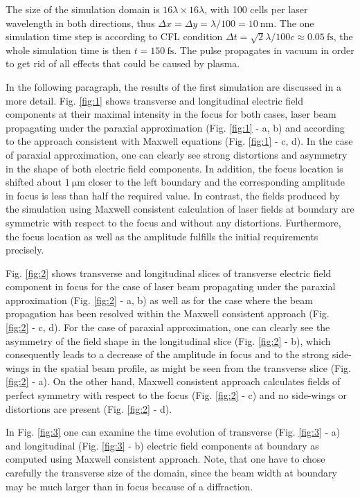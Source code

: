 The size of the simulation domain is $ 16 \lambda \times 16 \lambda $, with 100 cells per laser wavelength in both directions, thus $ \Delta x = \Delta y = \lambda/100 = 10 \: \mathrm{nm} $. The one simulation time step is according to CFL condition $ \Delta t = \sqrt{2} \lambda/ 100 c \approx 0.05 \: \mathrm{fs} $, the whole simulation time is then $ t = 150 \: \mathrm{fs} $. The pulse propagates in vacuum in order to get rid of all effects that could be caused by plasma.

In the following paragraph, the results of the first simulation are discussed in a more detail. Fig. \ref{fig:1} shows transverse and longitudinal electric field components at their maximal intensity in the focus for both cases, laser beam propagating under the paraxial approximation (Fig. \ref{fig:1} - a, b) and according to the approach consistent with Maxwell equations (Fig. \ref{fig:1} - c, d). In the case of paraxial approximation, one can clearly see strong distortions and asymmetry in the shape of both electric field components. In addition, the focus location is shifted about $ 1 \: \mathrm{\mu m} $ closer to the left boundary and the corresponding amplitude in focus is less than half the required value. In contrast, the fields produced by the simulation using Maxwell consistent calculation of laser fields at boundary are symmetric with respect to the focus and without any distortions. Furthermore, the focus location as well as the amplitude fulfills the initial requirements precisely.

Fig. \ref{fig:2} shows transverse and longitudinal slices of transverse electric field component in focus for the case of laser beam propagating under the paraxial approximation (Fig. \ref{fig:2} - a, b) as well as for the case where the beam propagation has been resolved within the Maxwell consistent approach (Fig. \ref{fig:2} - c, d). For the case of paraxial approximation, one can clearly see the asymmetry of the field shape in the longitudinal slice (Fig. \ref{fig:2} - b), which consequently leads to a decrease of the amplitude in focus and to the strong side-wings in the spatial beam profile, as might be seen from the transverse slice (Fig. \ref{fig:2} - a). On the other hand, Maxwell consistent approach calculates fields of perfect symmetry with respect to the focus (Fig. \ref{fig:2} - c) and no side-wings or distortions are present (Fig. \ref{fig:2} - d).

In Fig. \ref{fig:3} one can examine the time evolution of transverse (Fig. \ref{fig:3} - a) and longitudinal (Fig. \ref{fig:3} - b) electric field components at boundary as computed using Maxwell consistent approach. Note, that one have to chose carefully the transverse size of the domain, since the beam width at boundary may be much larger than in focus because of a diffraction.

